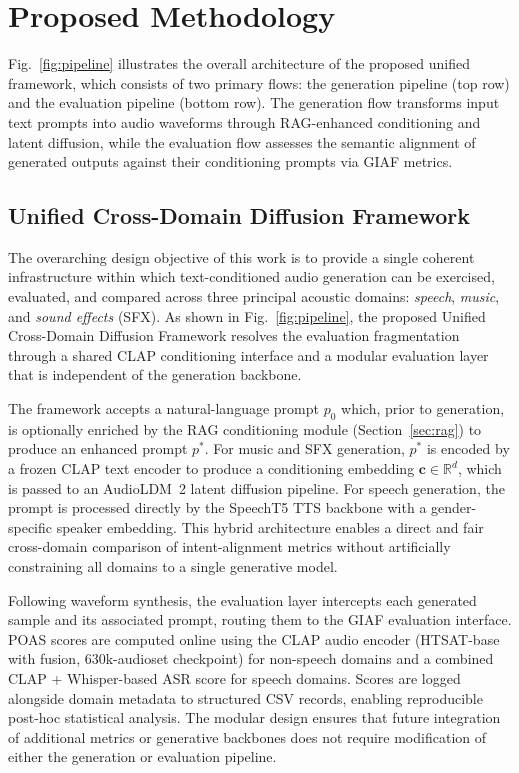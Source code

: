 \documentclass[journal]{IEEEtran}
\begin{document}
\section{Proposed Methodology}
\label{sec:method}

Fig.~\ref{fig:pipeline} illustrates the overall architecture of the
proposed unified framework, which consists of two primary flows: the
generation pipeline (top row) and the evaluation pipeline (bottom row).
The generation flow transforms input text prompts into audio waveforms
through RAG-enhanced conditioning and latent diffusion, while the
evaluation flow assesses the semantic alignment of generated outputs
against their conditioning prompts via GIAF metrics.

\subsection{Unified Cross-Domain Diffusion Framework}

The overarching design objective of this work is to provide a single
coherent infrastructure within which text-conditioned audio generation
can be exercised, evaluated, and compared across three principal
acoustic domains: \textit{speech}, \textit{music}, and
\textit{sound effects} (SFX). As shown in Fig.~\ref{fig:pipeline}, the proposed
Unified Cross-Domain Diffusion Framework resolves the evaluation
fragmentation through a shared CLAP conditioning interface and a
modular evaluation layer that is independent of the generation backbone.

The framework accepts a natural-language prompt $p_0$ which, prior to
generation, is optionally enriched by the RAG conditioning module
(Section~\ref{sec:rag}) to produce an enhanced prompt $p^*$. For
music and SFX generation, $p^*$ is encoded by a frozen CLAP text
encoder to produce a conditioning embedding
$\mathbf{c} \in \mathbb{R}^{d}$, which is passed to an AudioLDM~2
latent diffusion pipeline. For speech generation, the prompt is
processed directly by the SpeechT5 TTS backbone with a gender-specific
speaker embedding. This hybrid architecture enables a direct and fair
cross-domain comparison of intent-alignment metrics without artificially
constraining all domains to a single generative model.

Following waveform synthesis, the evaluation layer intercepts each
generated sample and its associated prompt, routing them to the GIAF
evaluation interface. POAS scores are computed online using the CLAP
audio encoder (HTSAT-base with fusion, 630k-audioset checkpoint) for
non-speech domains and a combined CLAP + Whisper-based ASR score for
speech domains. Scores are logged alongside domain metadata to
structured CSV records, enabling reproducible post-hoc statistical
analysis. The modular design ensures that future integration of
additional metrics or generative backbones does not require modification
of either the generation or evaluation pipeline.
\end{document}
